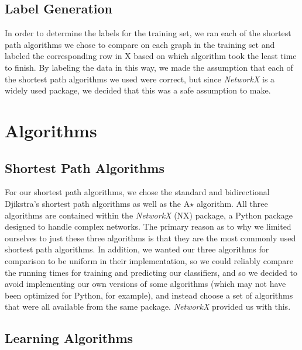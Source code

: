 \documentclass{article}
\begin{document}
\subsection{Label Generation}

In order to determine the labels for the training set, we ran each of the shortest path algorithms we chose to compare on each graph in the training set and labeled the corresponding row in X based on which algorithm took the least time to finish. By labeling the data in this way, we made the assumption that each of the shortest path algorithms we used were correct, but since \textit{NetworkX} is a widely used package, we decided that this was a safe assumption to make.

\section{Algorithms}

\subsection{Shortest Path Algorithms}

For our shortest path algorithms, we chose the standard and bidirectional Djikstra's shortest path algorithms as well as the A$\star$ algorithm. All three algorithms are contained within the \textit{NetworkX} (NX) package, a Python package designed to handle complex networks. The primary reason as to why we limited ourselves to just these three algorithms is that they are the most commonly used shortest path algorithms. In addition, we wanted our three algorithms for comparison to be uniform in their implementation, so we could reliably compare the running times for training and predicting our classifiers, and so we decided to avoid implementing our own versions of some algorithms (which may not have been optimized for Python, for example), and instead choose a set of algorithms that were all available from the same package. \textit{NetworkX} provided us with this.

\subsection{Learning Algorithms}
\end{document}
